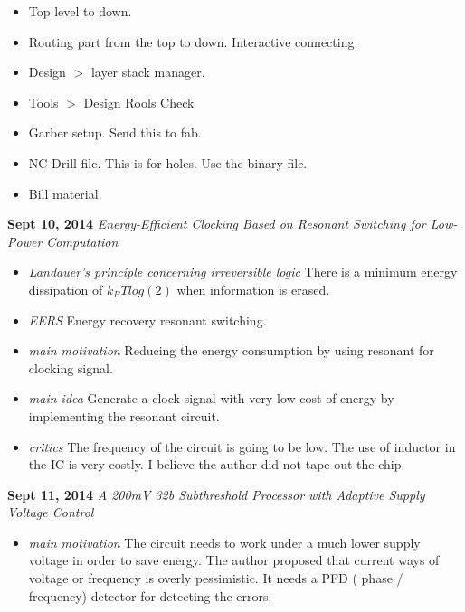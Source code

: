 \documentclass[]{article}
\begin{document}
\begin{itemize}
            \item   Top level to down. 
            \item   Routing part from the top to down. Interactive connecting.
            \item   Design $>$ layer stack manager.
            \item   Tools $>$ Design Rools Check
            \item   Garber setup. Send this to fab.
            \item   NC Drill file. This is for holes. Use the binary file.
            \item   Bill material.

            \end{itemize}

\noindent \textbf{ Sept 10, 2014}
\textit{Energy-Efficient Clocking Based on Resonant Switching for Low-Power Computation}
\indent		\begin{itemize}

            \item \textit{Landauer's principle concerning irreversible logic} There is a minimum energy dissipation of $k_{B}Tlog(2)$ when information is erased.
            \item \textit{EERS} Energy recovery resonant switching.    
        
            \item \textit{main motivation} Reducing the energy consumption by using resonant for clocking signal.

            \item \textit{main idea} Generate a clock signal with very low cost of energy by implementing the resonant circuit. 

            \item \textit {critics} The frequency of the circuit is going to be low.
            The use of inductor in the IC is very costly. I believe the author did not tape out the chip.

            \end{itemize}

\noindent \textbf{ Sept 11, 2014}
\textit{A 200mV 32b Subthreshold Processor with Adaptive Supply Voltage Control}
\indent		\begin{itemize}
            \item \textit{main motivation} The circuit needs to work under a much lower supply voltage in order to save energy. 
            The author proposed that current ways of voltage or frequency is overly pessimistic.
            It needs a PFD ( phase / frequency) detector for detecting the errors.




            \end{itemize}
\end{document}
